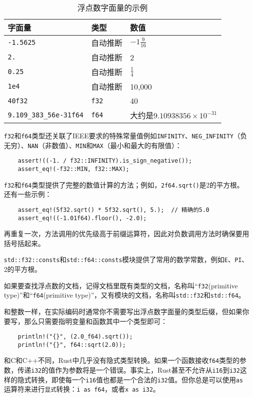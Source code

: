 \begin{table}[htbp]
    \centering
    \caption{浮点数字面量的示例}
    \label{t3-9}
    \begin{tabular}{lll}
        \hline
        \textbf{字面量} & \textbf{类型} & \textbf{数值} \\
        \hline
        \texttt{-1.5625}    & 自动推断  & $-1\frac{9}{16}$  \\
        \rowcolor{tablecolor}
        \texttt{2.}         & 自动推断  & 2 \\
        \texttt{0.25}       & 自动推断  & $\frac{1}{4}$   \\
        \rowcolor{tablecolor}
        \texttt{1e4}        & 自动推断  & 10,000    \\
        \texttt{40f32}      & \texttt{f32}  & 40    \\
        \rowcolor{tablecolor}
        \texttt{9.109\_383\_56e-31f64} & \texttt{f64} & 大约是$9.10938356\times10^{-31}$ \\
    \end{tabular}
\end{table}

\texttt{f32}和\texttt{f64}类型还关联了IEEE要求的特殊常量值例如\texttt{INFINITY}、\texttt{NEG\_INFINITY}（负无穷）、\texttt{NAN}（非数值）、\texttt{MIN}和\texttt{MAX}（最小和最大的有限值）：
\begin{verbatim}
    assert!((-1. / f32::INFINITY).is_sign_negative());
    assert_eq!(-f32::MIN, f32::MAX);
\end{verbatim}
\texttt{f32}和\texttt{f64}类型提供了完整的数值计算的方法；例如，\texttt{2f64.sqrt()}是2的平方根。还有一些示例：
\begin{verbatim}
    assert_eq!(5f32.sqrt() * 5f32.sqrt(), 5.);  // 精确的5.0
    assert_eq!((-1.01f64).floor(), -2.0);
\end{verbatim}

再重复一次，方法调用的优先级高于前缀运算符，因此对负数调用方法时确保要用括号括起来。

\texttt{std::f32::consts}和\texttt{std::f64::consts}模块提供了常用的数学常数，例如\texttt{E}、\texttt{PI}、2的平方根。

如果要查找浮点数的文档，记得文档里既有类型的文档，名称叫“\texttt{f32}(primitive type)”和“\texttt{f64}(primitive type)”，又有模块的文档，名称叫\texttt{std::f32}和\texttt{std::f64}。

和整数一样，在实际编码时通常你不需要写出浮点数字面量的类型后缀，但如果你要写，那么只需要指明变量和函数其中一个类型即可：
\begin{verbatim}
    println!("{}", (2.0_f64).sqrt());
    println!("{}", f64::sqrt(2.0));
\end{verbatim}
和C和C++不同，Rust中几乎没有隐式类型转换。如果一个函数接收\texttt{f64}类型的参数，传递\texttt{i32}的值作为参数将是一个错误。事实上，Rust甚至不允许从\texttt{i16}到\texttt{i32}这样的隐式转换，即使每一个\texttt{i16}值也都是一个合法的\texttt{i32}值。但你总是可以使用\texttt{as}运算符来进行\texttt{显式}转换：\texttt{i as f64}，或者\texttt{x as i32}。

